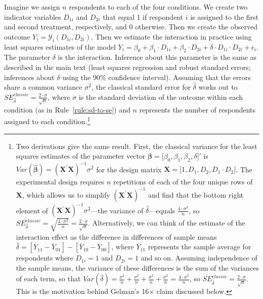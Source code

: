 \documentclass[12pt]{article}
\begin{document}
Imagine we assign $n$ respondents to each of the four conditions.
We create two indicator variables $D_{1i}$ and $D_{2i}$ that equal 1 if respondent $i$ is assigned to the first and second treatment, respectively, and 0 otherwise.
Then we create the observed outcome $Y_{i} = \mathcal{Y}_{i}\left( D_{1i},D_{2i} \right)$.
Then we estimate the interaction in practice using least squares estimates of the model
$Y_{i} = \beta_{0} + \beta_{1} \cdot D_{1i} + \beta_{2} \cdot D_{2i} + \delta \cdot D_{1i} \cdot D_{2i} + \epsilon_{i}$.
The parameter $\delta$ is the interaction.
Inference about this parameter is the same as described in the main text (least squares regression and robust standard errors; inferences about $\delta$ using the 90\% confidence interval).
Assuming that the errors share a common variance $\sigma^{2}$, the classical standard error for $\widehat{\delta}$ works out to $SE_{\widehat{\delta}}^{classic} = \frac{2 \cdot \sigma}{\sqrt{n}}$, where $\sigma$ is the standard deviation of the outcome within each condition (as in Rule~\ref{rule:sd-to-se}) and $n$ represents the number of respondents assigned to each condition.\footnote{
  Two derivations give the same result. First, the classical variance for the least squares estimates of the parameter vector $\boldsymbol{\beta} = \lbrack\beta_{0},\beta_{1},\beta_{2},\delta\rbrack'$ is $Var\left( \widehat{\boldsymbol{\beta}} \right) = \left( \mathbf{X}^{'}\mathbf{X} \right)^{-1}\sigma^{2}$ for the design matrix $\mathbf{X} = \lbrack 1,D_{1},D_{2},D_{1} \cdot D_{2}\rbrack$. The experimental design requires $n$ repetitions of each of the four unique rows of $\mathbf{X}$, which allows us to simplify $\left( \mathbf{X}^{'}\mathbf{X} \right)^{-1}$ and find that the bottom right element of $\left( \mathbf{X}^{'}\mathbf{X} \right)^{-1}\sigma^{2}$---the variance of $\widehat{\delta}$---equals $\frac{4 \cdot \sigma^2}{n}$, so $SE_{\widehat{\delta}}^{classic} = \sqrt{\frac{4 \cdot \sigma^{2}}{n}} = \frac{2 \cdot \sigma}{\sqrt{n}}$.
  Alternatively, we can think of the estimate of the interaction effect as the difference in differences of sample means $\widehat{\delta} = \left\lbrack {\overline{Y}}_{11}-{\overline{Y}}_{01} \right\rbrack - \left\lbrack {\overline{Y}}_{10}-{\overline{Y}}_{00} \right\rbrack$, where ${\overline{Y}}_{11}$ represents the sample average for respondents where $D_{1i} = 1$ and $D_{2i} = 1$ and so on. Assuming independence of the sample means, the variance of these differences is the sum of the variances of each term, so that $Var(\widehat{\delta}) = \frac{\sigma^{2}}{n} + \frac{\sigma^{2}}{n} + \frac{\sigma^{2}}{n} + \frac{\sigma^{2}}{n} = \frac{4 \cdot \sigma^{2}}{n}$, so $SE_{\widehat{\delta}}^{classic} = \frac{2 \cdot \sigma}{\sqrt{n}}$. This is the motivation behind Gelman's 16$\times$ claim discussed below.
  }
\end{document}
